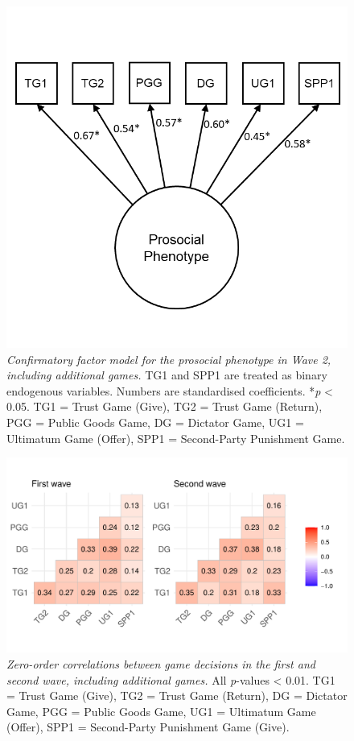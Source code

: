 \documentclass[
  man,floatsintext]{apa6}
\begin{document}
\begin{figure}
\includegraphics[width=0.8\linewidth]{images/cfaFull} \caption{\emph{Confirmatory factor model for the prosocial
phenotype in Wave 2, including additional games.} TG1 and SPP1 are treated as
binary endogenous variables. Numbers are standardised coefficients. *\emph{p} \textless{} 0.05.
TG1 = Trust Game (Give), TG2 = Trust Game (Return), PGG = Public Goods Game,
DG = Dictator Game, UG1 = Ultimatum Game (Offer), SPP1 = Second-Party Punishment
Game.}\label{fig:cfaPlotFull}
\end{figure}

\newpage







\begin{figure}
\centering
\includegraphics{manuscript_files/figure-latex/plotCorsFull-1.pdf}
\caption{\label{fig:plotCorsFull}\emph{Zero-order correlations between game decisions in
the first and second wave, including additional games.} All \emph{p}-values \textless{} 0.01.
TG1 = Trust Game (Give), TG2 = Trust Game (Return), DG = Dictator Game,
PGG = Public Goods Game, UG1 = Ultimatum Game (Offer), SPP1 = Second-Party
Punishment Game (Give).}
\end{figure}
\end{document}
